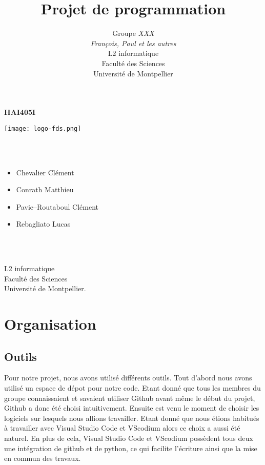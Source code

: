 \documentclass[a4paper, 12pt]{article}
\title{         %
  Projet de programmation}
\author{Groupe \emph{XXX}\\
  \emph{François, Paul et les autres}\\
    L2 informatique\\
  Faculté des Sciences\\
Université de Montpellier}
\begin{document}
\centerline{\Huge\bf HAI405I}
\vspace*{1.5cm}
\begin{center}               %
 
 
  \texttt{[image: logo-fds.png]}   %
 

\end{center}
\vspace*{1.5cm}


\vspace*{1.5cm}

\\ \\

\begin{itemize}\large
\item Chevalier Clément\large
\item Conrath Matthieu\large
\item Pavie--Routaboul Clément\large
\item Rebagliato Lucas\large
\end{itemize}
\\
\\
\vspace*{1.5cm}
\begin{center}
  L2 informatique\\
  Faculté des Sciences\\
Université de Montpellier.
\end{center}

\newpage

\section{Organisation}

\subsection{Outils}

Pour notre projet, nous avons utilisé différents outils. Tout d'abord nous avons utilisé un espace de dépot pour notre code. 
Etant donné que tous les membres du groupe connaissaient et savaient utiliser Github avant même le début du projet, Github a donc été choisi intuitivement. 
Ensuite est venu le moment de choisir les logiciels sur lesquels nous allions travailler. 
Etant donné que nous étions habitués à travailler avec Visual Studio Code et VScodium alors ce choix a aussi été naturel. 
En plus de cela, Visual Studio Code et VScodium possèdent tous deux une intégration de github et de python,  ce qui facilite l'écriture ainsi que la mise en commun des travaux.
\end{document}
